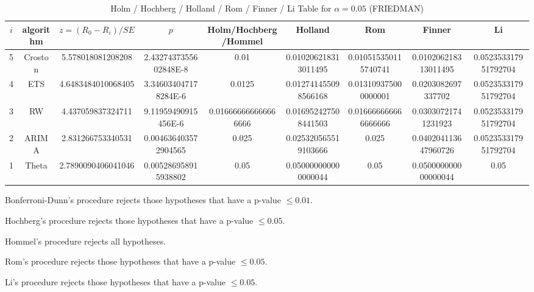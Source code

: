 \documentclass[a4paper,10pt]{article}
\begin{document}
\begin{landscape}
\begin{table}[!htp]
\centering\scriptsize
\caption{Holm / Hochberg / Holland / Rom / Finner / Li Table for $\alpha=0.05$ (FRIEDMAN)}
\begin{tabular}{ccccccccc}
$i$&algorithm&$z=(R_0 - R_i)/SE$&$p$&Holm/Hochberg/Hommel&Holland&Rom&Finner&Li\\
\hline
5&Croston&5.578018081208208&2.4327437355602848E-8&0.01&0.010206218313011495&0.010515350115740741&0.010206218313011495&0.052353317951792704\\
4&ETS&4.6483484010068405&3.346034047178284E-6&0.0125&0.012741455098566168&0.013109375000000001&0.0203082697337702&0.052353317951792704\\
3&RW&4.437059837324711&9.11959490915456E-6&0.016666666666666666&0.016952427508441503&0.016666666666666666&0.03030721741231923&0.052353317951792704\\
2&ARIMA&2.831266753340531&0.004636403572904565&0.025&0.025320565519103666&0.025&0.040204113647960726&0.052353317951792704\\
1&Theta&2.7890090406041046&0.005286958915938802&0.05&0.050000000000000044&0.05&0.050000000000000044&0.05\\
\hline
\end{tabular}
\end{table}
Bonferroni-Dunn's procedure rejects those hypotheses that have a p-value $\le0.01$.


Hochberg's procedure rejects those hypotheses that have a p-value $\le0.05$.


Hommel's procedure rejects all hypotheses.


Rom's procedure rejects those hypotheses that have a p-value $\le0.05$.


Li's procedure rejects those hypotheses that have a p-value $\le0.05$.



\newpage


\end{landscape}
\end{document}

